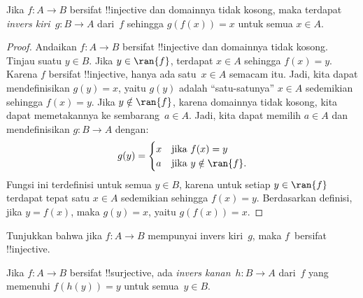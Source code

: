 \documentclass[../../../include/open-logic-section]{subfiles}
\begin{document}
\begin{prop}
Jika $f\colon A \to B$ bersifat !!{injective} dan domainnya tidak kosong, maka
terdapat \emph{invers kiri}~$g\colon B \to A$ dari~$f$ sehingga
$g(f(x)) = x$ untuk semua $x \in A$.
\end{prop}

\begin{proof}
Andaikan $f\colon A \to B$ bersifat !!{injective} dan domainnya tidak kosong.
Tinjau suatu $y \in B$.
Jika $y \in \ran{f}$, terdapat $x \in A$ sehingga $f(x) = y$. Karena $f$
bersifat !!{injective}, hanya ada satu~$x \in A$ semacam itu. Jadi, kita dapat
mendefinisikan $g(y) = x$, yaitu $g(y)$ adalah ``satu-satunya'' $x \in A$
sedemikian sehingga $f(x) = y$. Jika $y \notin \ran{f}$, karena domainnya
tidak kosong, kita dapat memetakannya ke sembarang~$a \in A$. Jadi, kita dapat
memilih $a \in A$ dan
mendefinisikan $g\colon B \to A$ dengan:
\[
g(y) = \begin{cases}
    x & \text{jika $f(x) = y$}\\
    a & \text{jika $y \notin \ran{f}$.}
\end{cases}
\]
Fungsi ini terdefinisi untuk semua $y \in B$, karena untuk setiap $y \in
\ran{f}$ terdapat tepat satu $x \in A$ sedemikian sehingga $f(x) = y$.
Berdasarkan definisi, jika $y = f(x)$, maka $g(y) = x$, yaitu $g(f(x)) = x$.
\end{proof}

\begin{prob}
Tunjukkan bahwa jika $f\colon A \to B$ mempunyai invers kiri~$g$, maka
$f$~bersifat !!{injective}.
\end{prob}

\begin{prop}
    Jika $f\colon A \to B$ bersifat !!{surjective}, ada
    \emph{invers kanan}~$h\colon B \to A$ dari~$f$ yang memenuhi $f(h(y)) = y$
    untuk semua~$y \in B$.
\end{prop}
\end{document}
